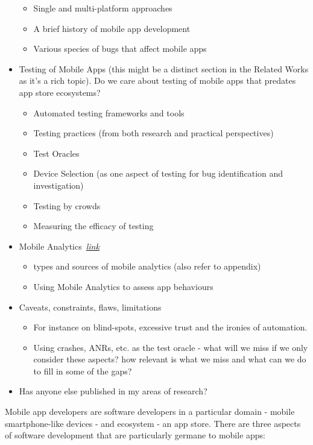 \begin{itemize}
    \begin{itemize}
        \item Single and multi-platform approaches
        \item A brief history of mobile app development
        \item Various species of bugs that affect mobile apps
    \end{itemize}
    \item Testing of Mobile Apps (this might be a distinct section in the Related Works as it's a rich topic). Do we care about testing of mobile apps that predates app store ecosystems?
    \begin{itemize}
        \item Automated testing frameworks and tools
        \item Testing practices (from both research and practical perspectives)
        \item Test Oracles
        \item Device Selection (as one aspect of testing for bug identification and investigation)
        \item Testing by crowds
        \item Measuring the efficacy of testing
    \end{itemize}
    \item Mobile Analytics~\hyperlink{mobile.analytics}{\emph{link}}
    \begin{itemize}
        \item types and sources of mobile analytics (also refer to appendix)
        \item Using Mobile Analytics to assess app behaviours
    \end{itemize}
    \item Caveats, constraints, flaws, limitations
    \begin{itemize}
        \item For instance on blind-spots, excessive trust and the ironies of automation. 
        \item Using crashes, ANRs, etc. as the test oracle - what will we miss if we only consider these aspects? how relevant is what we miss and what can we do to fill in some of the gaps?
    \end{itemize}
    \item Has anyone else published in my areas of research?
\end{itemize}

Mobile app developers are software developers in a particular domain - mobile smartphone-like devices - and ecosystem - an app store. There are three aspects of software development that are particularly germane to mobile apps: 


